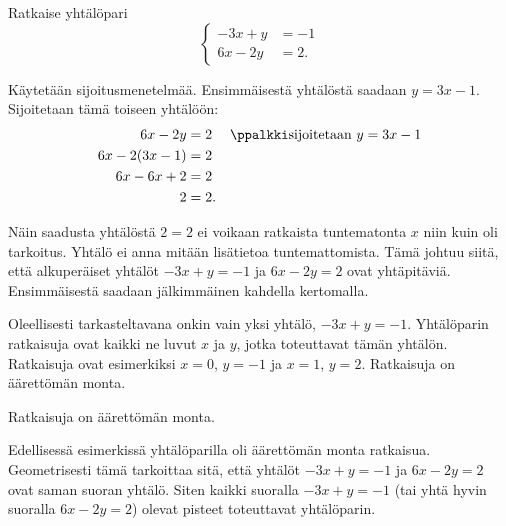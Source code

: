 \begin{esimerkki}
Ratkaise yhtälöpari
\[
\left\{
\begin{aligned}
-3x+y&= -1 \\
6x-2y&= 2.
\end{aligned}
\right.
\]
\begin{esimratk}
Käytetään sijoitusmenetelmää. Ensimmäisestä yhtälöstä saadaan $y=3x-1$. Sijoitetaan tämä toiseen yhtälöön:
\begin{align*}
6x-2y&= 2 && \ppalkki \text{sijoitetaan $y=3x-1$} \\
6x-2(3x-1)&= 2 && \\
6x-6x+2&= 2 && \\
2&= 2. &&
\end{align*}
\end{esimratk}
Näin saadusta yhtälöstä $2=2$ ei voikaan ratkaista tuntematonta $x$ niin kuin oli tarkoitus. Yhtälö ei anna mitään lisätietoa tuntemattomista. Tämä johtuu siitä, että alkuperäiset yhtälöt $-3x+y= -1$ ja $6x-2y= 2$ ovat yhtäpitäviä. Ensimmäisestä saadaan jälkimmäinen kahdella kertomalla.

Oleellisesti tarkasteltavana onkin vain yksi yhtälö, $-3x+y= -1$. Yhtälöparin ratkaisuja ovat kaikki ne luvut $x$ ja $y$, jotka toteuttavat tämän yhtälön. Ratkaisuja ovat esimerkiksi $x=0$, $y=-1$ ja $x=1$, $y=2$. Ratkaisuja on äärettömän monta.
\begin{esimvast}
Ratkaisuja on äärettömän monta.
\end{esimvast}
\end{esimerkki}

Edellisessä esimerkissä yhtälöparilla oli äärettömän monta ratkaisua. Geometrisesti tämä tarkoittaa sitä, että yhtälöt $-3x+y= -1$ ja $6x-2y= 2$ ovat saman suoran yhtälö. Siten kaikki suoralla $-3x+y= -1$ (tai yhtä hyvin suoralla $6x-2y= 2$) olevat pisteet toteuttavat yhtälöparin.

% 


